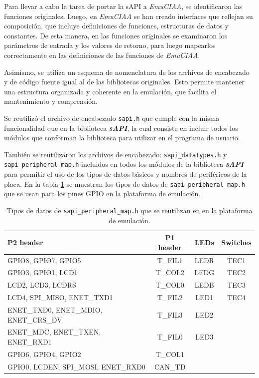 Para llevar a cabo la tarea de portar la sAPI a \textit{EmuCIAA}, se identificaron las funciones originales. Luego, en \textit{EmuCIAA} se han creado interfaces que reflejan su composición, que incluye definiciones de funciones, estructuras de datos y constantes.
De esta manera, en las funciones originales se examinaron los parámetros de entrada y los valores de retorno, para luego mapearlos correctamente en las definiciones de las funciones de \textit{EmuCIAA}. 

Asimismo, se utiliza un esquema de nomenclatura de los archivos de encabezado y de código fuente igual al de las bibliotecas originales. Esto permite mantener una estructura organizada y coherente en la emulación, que facilita el mantenimiento y comprensión.

Se reutilizó el archivo de encabezado \texttt{sapi.h} que cumple con la misma funcionalidad que en la biblioteca \textit{\textbf{sAPI}}, la cual consiste en incluir todos los módulos que conforman la biblioteca para utilizar en el programa de usuario. 

También se reutilizaron los archivos de encabezado: \texttt{sapi\_datatypes.h} y \newline \texttt{sapi\_peripheral\_map.h} incluidos en todos los módulos de la biblioteca \textit{\textbf{sAPI}} para permitir el uso de los tipos de datos básicos y nombres de periféricos de la placa. En la tabla \ref{tab:ConfiguracionGPIO} se muestran los tipos de datos de \texttt{sapi\_peripheral\_map.h} que se usan para los pines GPIO en la plataforma de emulación. 

\begin{table}[h]
	\centering
	\caption[\texttt{sapi\_peripheral\_map.h}.]{Tipos de datos de \texttt{sapi\_peripheral\_map.h} que se reutilizan en en la plataforma de emulación.}
	\begin{tabular}{l c c c}    
		\toprule
		\textbf{P2 header} & \textbf{P1 header} & \textbf{LEDs}  & \textbf{Switches}\\
		\midrule
		GPIO8, GPIO7, GPIO5 & T\_FIL1 &  LEDR &  TEC1\\		
		GPIO3, GPIO1, LCD1 & T\_COL2  & LEDG &  TEC2\\
		LCD2, LCD3, LCDRS & T\_COL0 & LEDB &  TEC3\\
		LCD4, SPI\_MISO, ENET\_TXD1 & T\_FIL2 & LED1 & TEC4\\
		ENET\_TXD0, ENET\_MDIO, ENET\_CRS\_DV & T\_FIL3 & LED2 & \\
	    ENET\_MDC, ENET\_TXEN, ENET\_RXD1 & T\_FIL0 & LED3 & \\
	    GPIO6, GPIO4, GPIO2 & T\_COL1&  & \\
	    GPIO0, LCDEN, SPI\_MOSI, ENET\_RXD0 & CAN\_TD&  & \\
		\bottomrule
		\hline
	\end{tabular}
	\label{tab:ConfiguracionGPIO}
\end{table}

